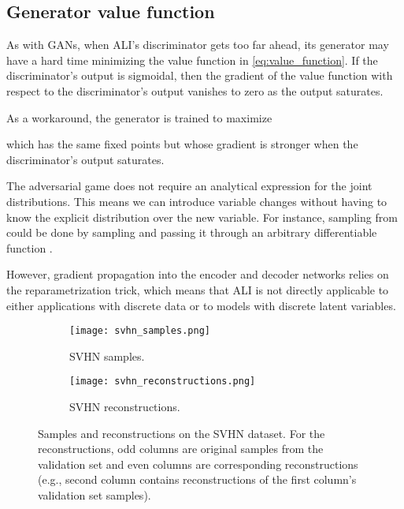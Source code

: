 \documentclass{article}
\newcommand{\figureHeight}{5cm}
\begin{document}
\subsection{Generator value function}

As with GANs, when ALI's discriminator gets too far ahead, its generator may
have a hard time minimizing the value function in \autoref{eq:value_function}.
If the discriminator's output is sigmoidal, then the gradient of the value
function with respect to the discriminator's output vanishes to zero as the
output saturates.

As a workaround, the generator is trained to maximize

which has the same fixed points but whose gradient is stronger when the
discriminator's output saturates.

The adversarial game does not require an analytical expression for the joint
distributions. This means we can introduce variable changes without having to
know the explicit distribution over the new variable.  For instance, sampling
from  could be done by sampling  and
passing it through an arbitrary differentiable function .

However, gradient propagation into the encoder and decoder networks relies on
the reparametrization trick, which means that ALI is not directly
applicable to either applications with discrete data or to models with
discrete latent variables.

\begin{figure}[p]
    \centering
    \begin{subfigure}[t]{0.49\textwidth}
        \centering
        \texttt{[image: svhn\_samples.png]}
        \caption{\label{fig:svhn_samples} SVHN samples.}
    \end{subfigure}
    \hfill
    \begin{subfigure}[t]{0.49\textwidth}
        \centering
        \texttt{[image: svhn\_reconstructions.png]}
        \caption{\label{fig:svhn_reconstructions} SVHN reconstructions.}
    \end{subfigure}
    \caption{\label{fig:svhn_images} Samples and reconstructions on the SVHN
        dataset. For the reconstructions, odd columns are
        original samples from the validation set and even columns are
        corresponding reconstructions (e.g., second column contains
        reconstructions of the first column's validation set samples).}
\end{figure}
\end{document}
